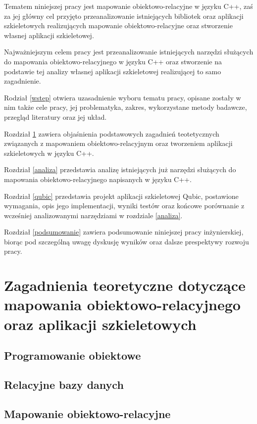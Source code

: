 \documentclass[12pt]{report}
\begin{document}
Tematem niniejszej pracy jest mapowanie obiektowo-relacyjne w języku C++, zaś za jej główny cel przyjęto przeanalizowanie istniejących bibliotek oraz aplikacji szkieletowych
realizujących mapowanie obiektowo-relacyjne oraz stworzenie własnej aplikacji szkieletowej.

Najważniejszym celem pracy jest przeanalizowanie istniejących narzędzi służących do mapowania obiektowo-relacyjnego w języku C++ oraz stworzenie na podstawie tej analizy
własnej aplikacji szkieletowej realizującej to samo zagadnienie.

Rodział \ref{wstep} otwiera uzasadnienie wyboru tematu pracy, opisane zostały w nim także cele pracy, jej problematyka, zakres, wykorzystane metody badawcze, prze\-gląd 
literatury oraz jej układ.

Rozdział \ref{teoria} zawiera objaśnienia podstawowych zagadnień teotetycznych związanych z mapowaniem obiektowo-relacyjnym oraz tworzeniem aplikacji szkieletowych w
języku C++.

Rozdział \ref{analiza} przedstawia analizę istniejących już narzędzi służących do mapowania obiektowo-relacyjnego napisanych w języku C++.

Rozdział \ref{qubic} przedstawia projekt aplikacji szkieletowej Qubic, postawione wymagania, opis jego implementacji, wyniki testów oraz końcowe porównanie z wcześniej
analizowanymi narzędziami w rozdziale \ref{analiza}.

Rozdział \ref{podsumowanie} zawiera podsumowanie niniejszej pracy inżynierskiej, biorąc pod szczególną uwagę dyskusję wyników oraz dalsze prespektywy rozwoju pracy.

\chapter[Zagadnienia teoretyczne]{Zagadnienia teoretyczne dotyczące mapowania obiektowo-relacyjnego oraz aplikacji szkieletowych} \label{teoria}

\section{Programowanie obiektowe}

\section{Relacyjne bazy danych}

\section{Mapowanie obiektowo-relacyjne}
\end{document}

